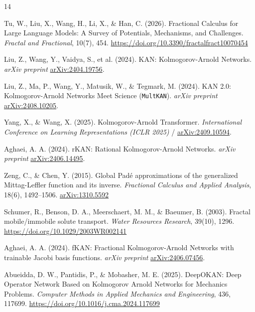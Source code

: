 \documentclass[10pt,twocolumn,a4paper]{article}
\begin{document}
\clearpage
\begin{thebibliography}{14}
\footnotesize
\setlength{\itemsep}{1.5pt}

Tu, W., Liu, X., Wang, H., Li, X., \& Han, C. (2026). Fractional Calculus for Large Language Models: A Survey of Potentials, Mechanisms, and Challenges. \textit{Fractal and Fractional}, 10(7), 454. \href{https://doi.org/10.3390/fractalfract10070454}{https://doi.org/10.3390/fractalfract10070454}

Liu, Z., Wang, Y., Vaidya, S., et al. (2024). KAN: Kolmogorov-Arnold Networks. \textit{arXiv preprint} \href{https://arxiv.org/abs/2404.19756}{arXiv:2404.19756}.

Liu, Z., Ma, P., Wang, Y., Matusik, W., \& Tegmark, M. (2024). KAN 2.0: Kolmogorov-Arnold Networks Meet Science (\texttt{MultKAN}). \textit{arXiv preprint} \href{https://arxiv.org/abs/2408.10205}{arXiv:2408.10205}.

Yang, X., \& Wang, X. (2025). Kolmogorov-Arnold Transformer. \textit{International Conference on Learning Representations (ICLR 2025)} / \href{https://arxiv.org/abs/2409.10594}{arXiv:2409.10594}.

Aghaei, A. A. (2024). rKAN: Rational Kolmogorov-Arnold Networks. \textit{arXiv preprint} \href{https://arxiv.org/abs/2406.14495}{arXiv:2406.14495}.

Zeng, C., \& Chen, Y. (2015). Global Pad\'e approximations of the generalized Mittag-Leffler function and its inverse. \textit{Fractional Calculus and Applied Analysis}, 18(6), 1492--1506. \href{https://arxiv.org/abs/1310.5592}{arXiv:1310.5592}

Schumer, R., Benson, D. A., Meerschaert, M. M., \& Baeumer, B. (2003). Fractal mobile/immobile solute transport. \textit{Water Resources Research}, 39(10), 1296. \href{https://doi.org/10.1029/2003WR002141}{https://doi.org/10.1029/2003WR002141}

Aghaei, A. A. (2024). fKAN: Fractional Kolmogorov-Arnold Networks with trainable Jacobi basis functions. \textit{arXiv preprint} \href{https://arxiv.org/abs/2406.07456}{arXiv:2406.07456}.

Abueidda, D. W., Pantidis, P., \& Mobasher, M. E. (2025). DeepOKAN: Deep Operator Network Based on Kolmogorov Arnold Networks for Mechanics Problems. \textit{Computer Methods in Applied Mechanics and Engineering}, 436, 117699. \href{https://doi.org/10.1016/j.cma.2024.117699}{https://doi.org/10.1016/j.cma.2024.117699}


\end{thebibliography}
\end{document}
